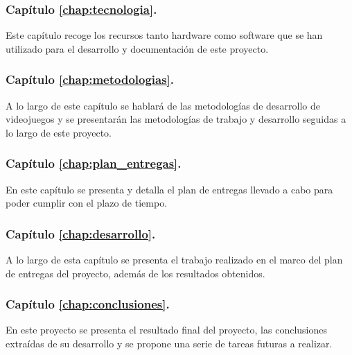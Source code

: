 \subsubsection{Capítulo \ref{chap:tecnologia}. }

Este capítulo recoge los recursos tanto hardware como software que se han utilizado para el desarrollo y documentación de este proyecto.

\subsubsection{Capítulo \ref{chap:metodologias}. }

A lo largo de este capítulo se hablará de las metodologías de desarrollo de videojuegos y se presentarán las metodologías de trabajo y desarrollo seguidas a lo largo de este proyecto.

\subsubsection{Capítulo \ref{chap:plan_entregas}. }

En este capítulo se presenta y detalla el plan de entregas llevado a cabo para poder cumplir con el plazo de tiempo.

\subsubsection{Capítulo \ref{chap:desarrollo}. }

A lo largo de esta capítulo se presenta el trabajo realizado en el marco del plan de entregas del proyecto, además de los resultados obtenidos.

\subsubsection{Capítulo \ref{chap:conclusiones}. }

En este proyecto se presenta el resultado final del proyecto, las conclusiones extraídas de su desarrollo y se propone una serie de tareas futuras a realizar.